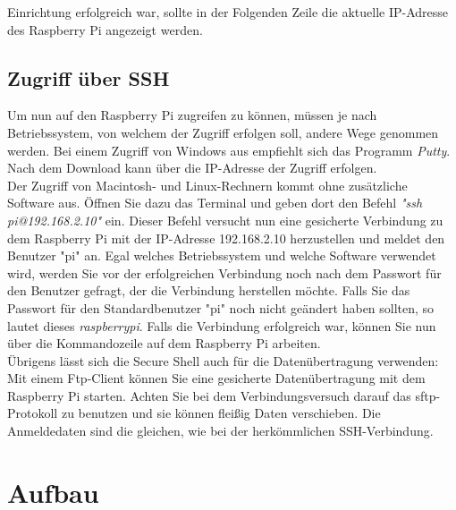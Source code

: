 \documentclass[12pt,a4paper]{scrreprt}
\begin{document}
Einrichtung erfolgreich war, sollte in der Folgenden Zeile die aktuelle IP-Adresse des Raspberry Pi angezeigt werden.


\section{Zugriff über SSH}
Um nun auf den Raspberry Pi zugreifen zu können, müssen je nach Betriebssystem, von welchem der Zugriff erfolgen soll, andere Wege genommen werden. Bei einem Zugriff von Windows aus empfiehlt sich das Programm \textit{Putty}. Nach dem Download kann über die IP-Adresse der Zugriff erfolgen. \\Der Zugriff von Macintosh- und Linux-Rechnern kommt ohne zusätzliche Software aus. Öffnen Sie dazu das Terminal und geben dort den Befehl \textit{"ssh pi@192.168.2.10"} ein. Dieser Befehl versucht nun eine gesicherte Verbindung zu dem Raspberry Pi mit der IP-Adresse 192.168.2.10 herzustellen und meldet den Benutzer "pi" an. Egal welches Betriebssystem und welche Software verwendet wird, werden Sie vor der erfolgreichen Verbindung noch nach dem Passwort für den Benutzer gefragt, der die Verbindung herstellen möchte. Falls Sie das Passwort für den Standardbenutzer "pi" noch nicht geändert haben sollten, so lautet dieses \textit{raspberrypi}. Falls die Verbindung erfolgreich war, können Sie nun über die Kommandozeile auf dem Raspberry Pi arbeiten. \\ Übrigens lässt sich die Secure Shell auch für die Datenübertragung verwenden: Mit einem Ftp-Client können Sie eine gesicherte Datenübertragung mit dem Raspberry Pi starten. Achten Sie bei dem Verbindungsversuch darauf das sftp-Protokoll zu benutzen und sie können fleißig Daten verschieben. Die Anmeldedaten sind die gleichen, wie bei der herkömmlichen SSH-Verbindung.

\chapter{Aufbau}
\end{document}
